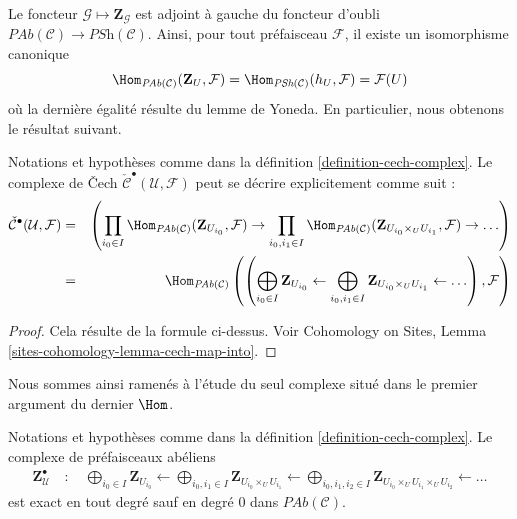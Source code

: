 \noindent
Le foncteur $\mathcal{G} \mapsto \mathbf{Z}_\mathcal{G}$ est adjoint \`a gauche du
foncteur d'oubli $\textit{PAb}(\mathcal{C}) \to \textit{PSh}(\mathcal{C})$.
Ainsi, pour tout pr\'efaisceau $\mathcal{F}$, il existe un isomorphisme canonique
$$
\Hom_{\textit{PAb}(\mathcal{C})}(\mathbf{Z}_U, \mathcal{F})
=
\Hom_{\textit{PSh}(\mathcal{C})}(h_U, \mathcal{F})
=
\mathcal{F}(U)
$$
o\`u la derni\`ere \'egalit\'e r\'esulte du lemme de Yoneda. En particulier, nous obtenons le
r\'esultat suivant.

\begin{lemma}
\label{lemma-cech-complex-describe}
Notations et hypoth\`eses comme dans la d\'efinition \ref{definition-cech-complex}.
Le complexe de {\v C}ech $\check{\mathcal{C}}^\bullet(\mathcal{U}, \mathcal{F})$
peut se d\'ecrire explicitement comme suit :
\begin{eqnarray*}
\check{\mathcal{C}}^\bullet(\mathcal{U}, \mathcal{F})
& = &
\left(
\prod_{i_0 \in I}
\Hom_{\textit{PAb}(\mathcal{C})}(\mathbf{Z}_{U_{i_0}}, \mathcal{F}) \to
\prod_{i_0, i_1 \in I}
\Hom_{\textit{PAb}(\mathcal{C})}(
\mathbf{Z}_{U_{i_0} \times_U U_{i_1}}, \mathcal{F}) \to \ldots
\right) \\
& = &
\Hom_{\textit{PAb}(\mathcal{C})}\left(
\left(
\bigoplus_{i_0 \in I} \mathbf{Z}_{U_{i_0}} \leftarrow
\bigoplus_{i_0, i_1 \in I} \mathbf{Z}_{U_{i_0} \times_U U_{i_1}} \leftarrow
\ldots
\right), \mathcal{F}\right)
\end{eqnarray*}
\end{lemma}

\begin{proof}
Cela r\'esulte de la formule ci-dessus. Voir
Cohomology on Sites, Lemma \ref{sites-cohomology-lemma-cech-map-into}.
\end{proof}

\noindent
Nous sommes ainsi ramen\'es \`a l'\'etude du seul complexe situ\'e dans le premier argument du
dernier $\Hom$.

\begin{lemma}
\label{lemma-exact}
Notations et hypoth\`eses comme dans la d\'efinition \ref{definition-cech-complex}.
Le complexe de pr\'efaisceaux ab\'eliens
\begin{align*}
\mathbf{Z}_\mathcal{U}^\bullet \quad : \quad
\bigoplus_{i_0 \in I} \mathbf{Z}_{U_{i_0}} \leftarrow
\bigoplus_{i_0, i_1 \in I} \mathbf{Z}_{U_{i_0} \times_U U_{i_1}} \leftarrow
\bigoplus_{i_0, i_1, i_2 \in I}
\mathbf{Z}_{U_{i_0} \times_U U_{i_1} \times_U U_{i_2}} \leftarrow
\ldots
\end{align*}
est exact en tout degr\'e sauf en degr\'e $0$ dans $\textit{PAb}(\mathcal{C})$.
\end{lemma}

